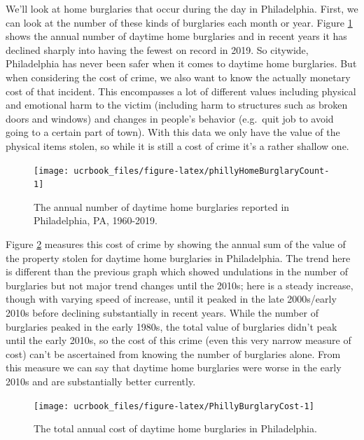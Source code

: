\documentclass[
  12pt,
  openany]{book}
\begin{document}
We'll look at home burglaries that occur during the day in Philadelphia. First, we can look at the number of these kinds of burglaries each month or year. Figure \ref{fig:phillyHomeBurglaryCount} shows the annual number of daytime home burglaries and in recent years it has declined sharply into having the fewest on record in 2019. So citywide, Philadelphia has never been safer when it comes to daytime home burglaries. But when considering the cost of crime, we also want to know the actually monetary cost of that incident. This encompasses a lot of different values including physical and emotional harm to the victim (including harm to structures such as broken doors and windows) and changes in people's behavior (e.g.~quit job to avoid going to a certain part of town). With this data we only have the value of the physical items stolen, so while it is still a cost of crime it's a rather shallow one.

\begin{figure}

{\centering \texttt{[image: ucrbook\_files/figure-latex/phillyHomeBurglaryCount-1]} 

}

\caption{The annual number of daytime home burglaries reported in Philadelphia, PA, 1960-2019.}\label{fig:phillyHomeBurglaryCount}
\end{figure}

Figure \ref{fig:PhillyBurglaryCost} measures this cost of crime by showing the annual sum of the value of the property stolen for daytime home burglaries in Philadelphia. The trend here is different than the previous graph which showed undulations in the number of burglaries but not major trend changes until the 2010s; here is a steady increase, though with varying speed of increase, until it peaked in the late 2000s/early 2010s before declining substantially in recent years. While the number of burglaries peaked in the early 1980s, the total value of burglaries didn't peak until the early 2010s, so the cost of this crime (even this very narrow measure of cost) can't be ascertained from knowing the number of burglaries alone. From this measure we can say that daytime home burglaries were worse in the early 2010s and are substantially better currently.

\begin{figure}

{\centering \texttt{[image: ucrbook\_files/figure-latex/PhillyBurglaryCost-1]} 

}

\caption{The total annual cost of daytime home burglaries in Philadelphia.}\label{fig:PhillyBurglaryCost}
\end{figure}
\end{document}
